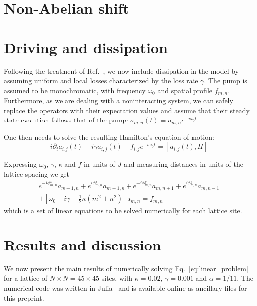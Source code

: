 \documentclass[twocolumn, 10pt, aps, superscriptaddress, floatfix, showpacs, pra, citeautoscript]{revtex4-1}
\begin{document}

\section{Non-Abelian shift}\label{sec:non-abelian-shift}

\section{Driving and dissipation}\label{sec:driven-dissipation}

Following the treatment of Ref.~, we now
include dissipation in the model by assuming uniform and local losses
characterized by the loss rate $\gamma$. The pump is assumed to be
monochromatic, with frequency $\omega_0$ and spatial profile
$f_{m,n}$.  Furthermore, as we are dealing with a noninteracting
system, we can safely replace the operators with their expectation
values and assume that their steady state evolution follows that of
the pump: $a_{m,n}(t) = a_{m,n} e^{-i \omega_0 t}$.

One then needs to solve the resulting Hamilton's equation of motion:
%
\begin{equation}
i\partial_{t}a_{i,j}(t)+i\gamma
a_{i,j}(t)-f_{i,j}e^{-i\omega_{0}t}=\left[a_{i,j}(t),H\right]
\end{equation}

Expressing $\omega_{0}$, $\gamma$, $\kappa$ and $f$ in units of $J$
and measuring distances in units of the lattice spacing we get
%
\begin{multline}\label{eq:linear_problem}
e^{-i\phi_{m,n}^x}a_{m+1,n}+e^{i\phi_{m,n}^x}a_{m-1,n}+e^{-i\phi_{m,n}^y}a_{m,n+1}+e^{i\phi_{m,n}^y}a_{m,n-1}\\
+\left[\omega_{0}+i\gamma-\frac{1}{2}\kappa
(m^{2}+n^{2})\right]a_{m,n}=f_{m,n}
\end{multline}
which is a set of linear equations to be solved numerically for each
lattice site.


\section{Results and discussion}
\label{sec:results}

We now present the main results of numerically solving
Eq.~\eqref{eq:linear_problem} for a lattice of
$N \times N = 45 \times 45$ sites, with $\kappa = 0.02$,
$\gamma = 0.001$ and $\alpha = 1/11$.  The numerical code was written
in Julia~\cite{bezanson2014julia} and is available online as ancillary
files for this preprint.
\end{document}
